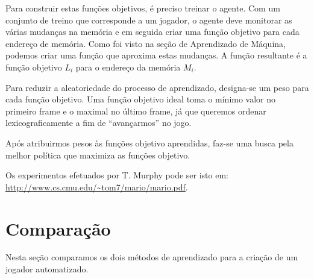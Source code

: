 \documentclass[a4paper,10pt]{article}
\theoremstyle{plain}
\begin{document}
Para construir estas funções objetivos, é preciso treinar o agente. Com um conjunto de treino que
corresponde a um jogador, o agente deve monitorar as várias mudanças na memória e em seguida criar
uma função objetivo para cada endereço de memória. Como foi visto na seção de Aprendizado de
Máquina, podemos criar uma função que aproxima estas mudanças. A função resultante é a função
objetivo $L_i$ para o endereço da memória $M_i$.

Para reduzir a aleatoriedade do processo de aprendizado, designa-se um peso para cada função
objetivo. Uma função objetivo ideal toma o mínimo valor no primeiro frame e o maximal no último
frame, já que queremos ordenar lexicograficamente a fim de ``avançarmos'' no jogo.

Após atribuirmos pesos às funções objetivo aprendidas, faz-se uma busca pela melhor política que
maximiza as funções objetivo.

Os experimentos efetuados por T. Murphy pode ser isto em:
\url{http://www.cs.cmu.edu/~tom7/mario/mario.pdf}.

\section{Comparação}

Nesta seção comparamos os dois métodos de aprendizado para a criação de um jogador automatizado.



\newpage
\printbibliography
\end{document}
